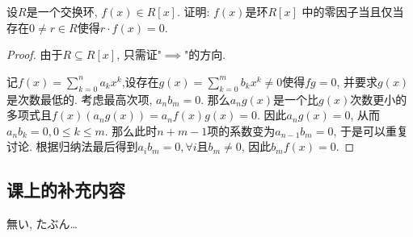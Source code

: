\documentclass{../solutions-cn}
\begin{document}
\begin{exercise}[习题2.3.8]
    设$R$是一个交换环, $f(x) \in R[x]$. 证明: $f(x)$是环$R[x]$
中的零因子当且仅当存在$0 \neq r \in R$使得$r \cdot f(x) = 0$.
\end{exercise}

\begin{proof}
    由于$R \subseteq R[x]$, 只需证"$\implies$"的方向.

    记$f(x) = \sum_{k = 0}^{n} a_kx^k$,设存在$g(x) = \sum_{k = 0}^{m} b_kx^k \neq 0$使得$fg = 0$, 并要求$g(x)$是次数最低的. 考虑最高次项, $a_nb_m = 0$. 那么$a_ng(x)$是一个比$g(x)$次数更小的多项式且$f(x)(a_ng(x)) = a_nf(x)g(x) = 0$. 因此$a_ng(x) = 0$, 从而$a_nb_k = 0, 0 \leqslant k \leqslant m$. 那么此时$n + m - 1$项的系数变为$a_{n - 1}b_m = 0$, 于是可以重复讨论. 根据归纳法最后得到$a_ib_m = 0, \forall i$且$b_m \neq 0$, 因此$b_mf(x) = 0$.
\end{proof}

\subsection*{课上的补充内容}
    無い, たぶん\dots
\end{document}
